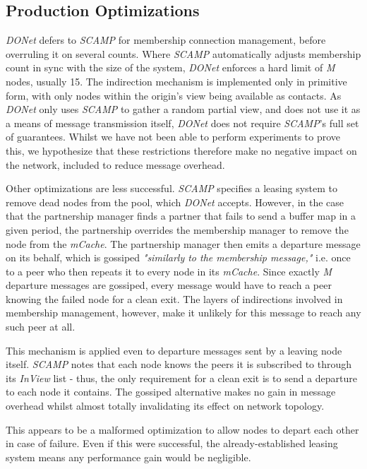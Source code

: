\documentclass[12pt,a4paper]{article}
\begin{document}
\subsection{Production Optimizations} \label{problems:prodopt}
\textit{DONet} defers to \textit{SCAMP} for membership connection management,  before overruling it on several counts. Where \textit{SCAMP} automatically adjusts membership count in sync with the size of the system, \textit{DONet} enforces a hard limit of \textit{M} nodes, usually 15. The indirection mechanism is implemented only in primitive form, with only nodes within the origin's view being available as contacts. As \textit{DONet} only uses \textit{SCAMP} to gather a random partial view, and does not use it as a means of message transmission itself, \textit{DONet} does not require \textit{SCAMP}'s full set of guarantees. Whilst we have not been able to perform experiments to prove this, we hypothesize that these restrictions therefore make no negative impact on the network, included to reduce message overhead.

Other optimizations are less successful. \textit{SCAMP} specifies a leasing system to remove dead nodes from the pool, which \textit{DONet} accepts. However, in the case that the partnership manager finds a partner that fails to send a buffer map in a given period, the partnership overrides the membership manager to remove the node from the \textit{mCache}. The partnership manager then emits a departure message on its behalf, which is gossiped \textit{"similarly to the membership message,"} i.e. once to a peer who then repeats it to every node in its \textit{mCache}. Since exactly \textit{M} departure messages are gossiped, every message would have to reach a peer knowing the failed node for a clean exit. The layers of indirections involved in membership management, however, make it unlikely for this message to reach any such peer at all.

This mechanism is applied even to departure messages sent by a leaving node itself. \textit{SCAMP} notes that each node knows the peers it is subscribed to through its \textit{InView} list - thus, the only requirement for a clean exit is to send a departure to each node it contains. The gossiped alternative makes no gain in message overhead whilst almost totally invalidating its effect on network topology.

This appears to be a malformed optimization to allow nodes to depart each other in case of failure. Even if this were successful, the already-established leasing system means any performance gain would be negligible.
\end{document}
